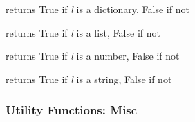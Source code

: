 \documentclass[letterpaper,10pt,english]{sphinxmanual}
\begin{document}
\begin{fulllineitems}
\label{pytan.utils:pytan.utils.is_dict}
returns True if \emph{l} is a dictionary, False if not

\end{fulllineitems}


\begin{fulllineitems}
\label{pytan.utils:pytan.utils.is_list}
returns True if \emph{l} is a list, False if not

\end{fulllineitems}


\begin{fulllineitems}
\label{pytan.utils:pytan.utils.is_num}
returns True if \emph{l} is a number, False if not

\end{fulllineitems}


\begin{fulllineitems}
\label{pytan.utils:pytan.utils.is_str}
returns True if \emph{l} is a string, False if not

\end{fulllineitems}



\subsubsection{Utility Functions: Misc}
\label{pytan.utils:utility-functions-misc}
\end{document}
